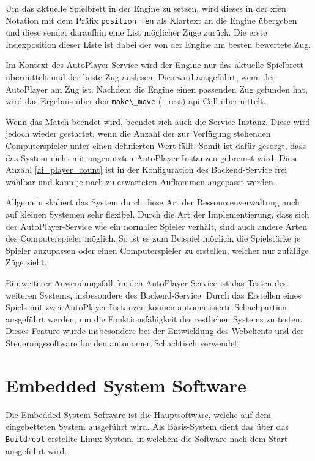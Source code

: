 Um das aktuelle Spielbrett in der Engine zu setzen, wird dieses in der
\gls{xfen} Notation mit dem Präfix
\passthrough{\lstinline!position fen!} als Klartext an die Engine
übergeben und diese sendet daraufhin eine List möglicher Züge zurück.
Die erste Indexposition dieser Liste ist dabei der von der Engine am
besten bewertete Zug.

Im Kontext des AutoPlayer-Service wird der Engine nur das aktuelle
Spielbrett übermittelt und der beste Zug auslesen. Dies wird ausgeführt,
wenn der AutoPlayer am Zug ist. Nachdem die Engine einen passenden Zug
gefunden hat, wird das Ergebnis über den
\passthrough{\lstinline!make\_move!} (+rest)-\gls{api} Call übermittelt.

Wenn das Match beendet wird, beendet sich auch die Service-Instanz.
Diese wird jedoch wieder gestartet, wenn die Anzahl der zur Verfügung
stehenden Computerspieler unter einen definierten Wert fällt. Somit ist
dafür gesorgt, dass das System nicht mit ungenutzten
AutoPlayer-Instanzen gebremst wird. Diese Anzahl \ref{ai_player_count}
ist in der Konfiguration des Backend-Service frei wählbar und kann je
nach zu erwarteten Aufkommen angepasst werden.

Allgemein skaliert das System durch diese Art der Ressourcenverwaltung
auch auf kleinen Systemen sehr flexibel. Durch die Art der
Implementierung, dass sich der AutoPlayer-Service wie ein normaler
Spieler verhält, sind auch andere Arten des Computerspieler möglich. So
ist es zum Beispiel möglich, die Spielstärke je Spieler anzupassen oder
einen Computerspieler zu erstellen, welcher nur zufällige Züge zieht.

Ein weiterer Anwendungsfall für den AutoPlayer-Service ist das Testen
des weiteren Systems, insbesondere des Backend-Service. Durch das
Erstellen eines Spiels mit zwei AutoPlayer-Instanzen können
automatisierte Schachpartien ausgeführt werden, um die
Funktionsfähigkeit des restlichen Systems zu testen. Dieses Feature
wurde insbesondere bei der Entwicklung des Webclients und der
Steuerungssoftware für den autonomen Schachtisch verwendet.

\hypertarget{embedded-system-software}{%
\chapter{Embedded System Software}\label{embedded-system-software}}

Die Embedded System Software ist die Hauptsoftware, welche auf dem
eingebetteten System ausgeführt wird. Als Basis-System dient das über
das \passthrough{\lstinline!Buildroot!} erstellte Linux-System, in
welchem die Software nach dem Start ausgeführt wird.

